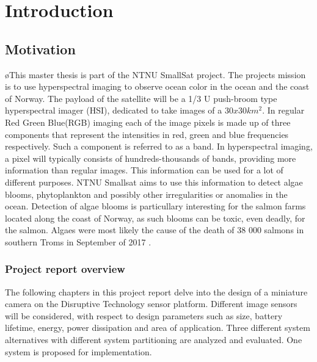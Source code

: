 \newpage
\chapter{Introduction}
\label{sec:introduction}
\section{Motivation}

øThis master thesis is part of the NTNU SmallSat \cite{SmallSat_project_description} project. The projects mission is to use hyperspectral imaging to observe ocean color in the ocean and the coast of Norway. The payload of the satellite will be a 1/3 U push-broom type hyperspectral imager (HSI), dedicated to take images of a $30x30 km^2$. In regular Red Green Blue(RGB) imaging each of the image pixels is made up of three components that represent the intensities in red, green and blue frequencies respectively. Such a component is referred to as a band. In hyperspectral imaging, a pixel will typically consists of hundreds-thousands of bands, providing more information than regular images. This information can be used for a lot of different purposes. NTNU Smallsat aims to use this information to detect algae blooms, phytoplankton and possibly other irregularities or anomalies in the ocean. Detection of algae blooms is particullary interesting for the salmon farms located along the coast of Norway, as such blooms can be toxic, even deadly, for the salmon. Algaes were most likely the cause of the death of 38 000 salmons in southern Troms in September of 2017 \cite{laksedeath}.  %




\newpage
\subsection{Project report overview}
The following chapters in this project report delve into the design of a miniature camera on the Disruptive Technology sensor platform. Different image sensors will be considered, with respect to design parameters such as size, battery lifetime, energy, power dissipation and area of application. Three different system alternatives with different system partitioning are analyzed and evaluated. One system is proposed for implementation.\\  

